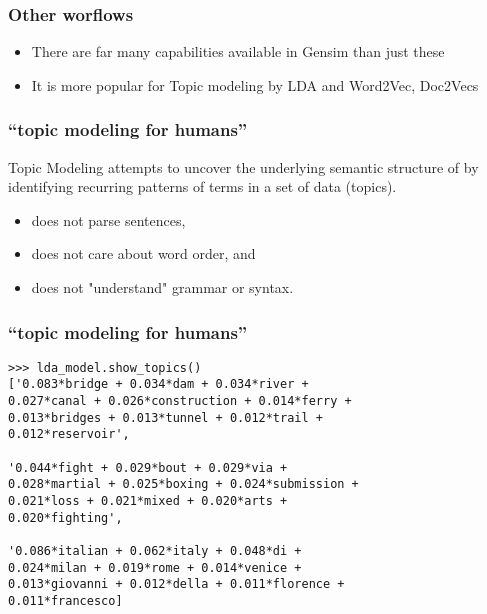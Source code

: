 \begin{frame}[fragile]\frametitle{Other worflows}

\begin{itemize}
\item There are far many capabilities available in Gensim than just these
\item It is more popular for Topic modeling by LDA and Word2Vec, Doc2Vecs
\end{itemize}


\end{frame}

\begin{frame}[fragile]\frametitle{“topic modeling for humans''}

Topic Modeling attempts to uncover the
underlying semantic structure of by identifying
recurring patterns of terms in a set of data
(topics).


\begin{itemize}
\item does not parse sentences,
\item does not care about word order, and
\item does not "understand" grammar or syntax.
\end{itemize}

\end{frame}

\begin{frame}[fragile]\frametitle{“topic modeling for humans''}

\begin{lstlisting}
>>> lda_model.show_topics()
['0.083*bridge + 0.034*dam + 0.034*river +
0.027*canal + 0.026*construction + 0.014*ferry +
0.013*bridges + 0.013*tunnel + 0.012*trail +
0.012*reservoir',

'0.044*fight + 0.029*bout + 0.029*via +
0.028*martial + 0.025*boxing + 0.024*submission +
0.021*loss + 0.021*mixed + 0.020*arts +
0.020*fighting',

'0.086*italian + 0.062*italy + 0.048*di +
0.024*milan + 0.019*rome + 0.014*venice +
0.013*giovanni + 0.012*della + 0.011*florence +
0.011*francesco]
\end{lstlisting}
\end{frame}

